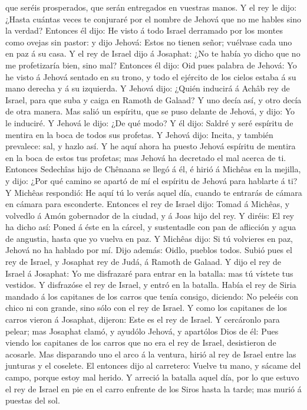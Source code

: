 que seréis prosperados, que serán entregados en vuestras manos.
 Y el rey le dijo: ¿Hasta cuántas veces te conjuraré por
el nombre de Jehová que no me hables sino la verdad? 
Entonces él dijo: He visto á todo Israel derramado por los montes como
ovejas sin pastor: y dijo Jehová: Estos no tienen señor; vuélvase cada
uno en paz á su casa.  Y el rey de Israel dijo á
Josaphat: ¿No te había yo dicho que no me profetizaría bien, sino mal?
 Entonces él dijo: Oid pues palabra de Jehová: Yo he
visto á Jehová sentado en su trono, y todo el ejército de los cielos
estaba á su mano derecha y á su izquierda.  Y Jehová
dijo: ¿Quién inducirá á Achâb rey de Israel, para que suba y caiga en
Ramoth de Galaad? Y uno decía así, y otro decía de otra manera.
 Mas salió un espíritu, que se puso delante de Jehová, y
dijo: Yo le induciré. Y Jehová le dijo: ¿De qué modo?  Y
él dijo: Saldré y seré espíritu de mentira en la boca de todos sus
profetas. Y Jehová dijo: Incita, y también prevalece: sal, y hazlo así.
 Y he aquí ahora ha puesto Jehová espíritu de mentira en
la boca de estos tus profetas; mas Jehová ha decretado el mal acerca de
ti.  Entonces Sedechîas hijo de Chênaana se llegó á él, é
hirió á Michêas en la mejilla, y dijo: ¿Por qué camino se apartó de mí
el espíritu de Jehová para hablarte á ti?  Y Michêas
respondió: He aquí tú lo verás aquel día, cuando te entrarás de cámara
en cámara para esconderte.  Entonces el rey de Israel
dijo: Tomad á Michêas, y volvedlo á Amón gobernador de la ciudad, y á
Joas hijo del rey.  Y diréis: El rey ha dicho así: Poned
á éste en la cárcel, y sustentadle con pan de aflicción y agua de
angustia, hasta que yo vuelva en paz.  Y Michêas dijo: Si
tú volvieres en paz, Jehová no ha hablado por mí. Dijo además: Oidlo,
pueblos todos.  Subió pues el rey de Israel, y Josaphat
rey de Judá, á Ramoth de Galaad.  Y dijo el rey de Israel
á Josaphat: Yo me disfrazaré para entrar en la batalla: mas tú vístete
tus vestidos. Y disfrazóse el rey de Israel, y entró en la batalla.
 Había el rey de Siria mandado á los capitanes de los
carros que tenía consigo, diciendo: No peleéis con chico ni con grande,
sino sólo con el rey de Israel.  Y como los capitanes de
los carros vieron á Josaphat, dijeron: Este es el rey de Israel. Y
cercáronlo para pelear; mas Josaphat clamó, y ayudólo Jehová, y
apartólos Dios de él:  Pues viendo los capitanes de los
carros que no era el rey de Israel, desistieron de acosarle.
 Mas disparando uno el arco á la ventura, hirió al rey de
Israel entre las junturas y el coselete. El entonces dijo al carretero:
Vuelve tu mano, y sácame del campo, porque estoy mal herido.
 Y arreció la batalla aquel día, por lo que estuvo el rey
de Israel en pie en el carro enfrente de los Siros hasta la tarde; mas
murió á puestas del sol.

